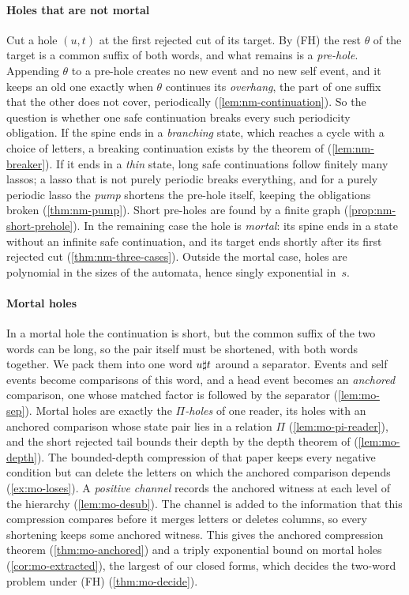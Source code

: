 \paragraph{Holes that are not mortal}
Cut a hole $(u,t)$ at the first rejected cut of its target. By (FH) the rest
$\theta$ of the target is a common suffix of both words, and what remains is a
\emph{pre-hole}. Appending $\theta$ to a pre-hole creates no new event and no
new self event, and it keeps an old one exactly when $\theta$ continues its
\emph{overhang}, the part of one suffix that the other does not cover,
periodically (\cref{lem:nm-continuation}). So the question is whether one safe
continuation breaks every such periodicity obligation. If the spine ends
in a \emph{branching} state, which reaches a cycle with a choice of letters, a
breaking continuation exists by the theorem of \citet{FineWilf65}
(\cref{lem:nm-breaker}). If it ends in a \emph{thin} state, long safe
continuations follow finitely many lassos; a lasso that is not purely periodic
breaks everything, and for a purely periodic lasso the \emph{pump} shortens
the pre-hole itself, keeping the obligations broken (\cref{thm:nm-pump}).
Short pre-holes are found by a finite graph (\cref{prop:nm-short-prehole}). In
the remaining case the hole is \emph{mortal}: its spine ends in a state
without an infinite safe continuation, and its target ends shortly after its
first rejected cut (\cref{thm:nm-three-cases}). Outside the mortal case,
holes are polynomial in the sizes of the automata, hence singly exponential
in~$s$.

\paragraph{Mortal holes}
In a mortal hole the continuation is short, but the common suffix of the two
words can be long, so the pair itself must be shortened, with both words
together. We pack them into one word $u\sharp t$ around a separator. Events and
self events become comparisons of this word, and a head event becomes an
\emph{anchored} comparison, one whose matched factor is followed by the
separator (\cref{lem:mo-sep}). Mortal holes are exactly the
\emph{$\Pi$-holes} of one reader, its holes with an anchored comparison whose
state pair lies in a relation $\Pi$ (\cref{lem:mo-pi-reader}), and the short
rejected tail bounds their depth by the depth theorem of \citet{Zhao26}
(\cref{lem:mo-depth}). The bounded-depth compression of that paper keeps every negative
condition but can delete the letters on which the anchored comparison depends
(\cref{ex:mo-loses}). A \emph{positive channel} records the anchored witness
at each level of the hierarchy (\cref{lem:mo-desub}). The channel is added to
the information that this compression compares before it merges
letters or deletes columns, so every shortening keeps some anchored witness.
This gives the anchored compression theorem (\cref{thm:mo-anchored}) and a
triply exponential bound on mortal holes (\cref{cor:mo-extracted}), the
largest of our closed forms, which decides the two-word problem under (FH)
(\cref{thm:mo-decide}).

